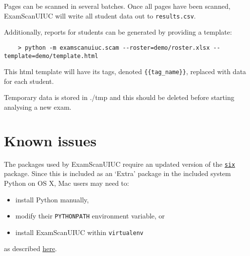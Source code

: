\documentclass[a4paper]{article}
\begin{document}
Pages can be scanned in several batches.
Once all pages have been scanned, ExamScanUIUC will write all student data out to \texttt{results.csv}.

Additionally, reports for students can be generated by providing a template:
\begin{lstlisting}
	> python -m examscanuiuc.scam --roster=demo/roster.xlsx --template=demo/template.html
\end{lstlisting}

This html template will have its tags, denoted \texttt{\{\{tag\_name\}\}}, replaced with data for each student.

Temporary data is stored in ./tmp and this should be deleted before starting analysing a new exam.

\section{Known issues}

The packages used by ExamScanUIUC require an updated version of the \href{https://pypi.org/project/six/}{\texttt{six}} package.
Since this is included as an `Extra' package in the included system Python on OS X, Mac users may need to:
\begin{itemize}
\item install Python manually,
\item modify their \texttt{PYTHONPATH} environment variable, or
\item install ExamScanUIUC within \texttt{virtualenv}
\end{itemize}
as described \href{http://stackoverflow.com/questions/29485741/unable-to-upgrade-python-six-package-in-mac-osx-10-10-2}{here}.
\end{document}
